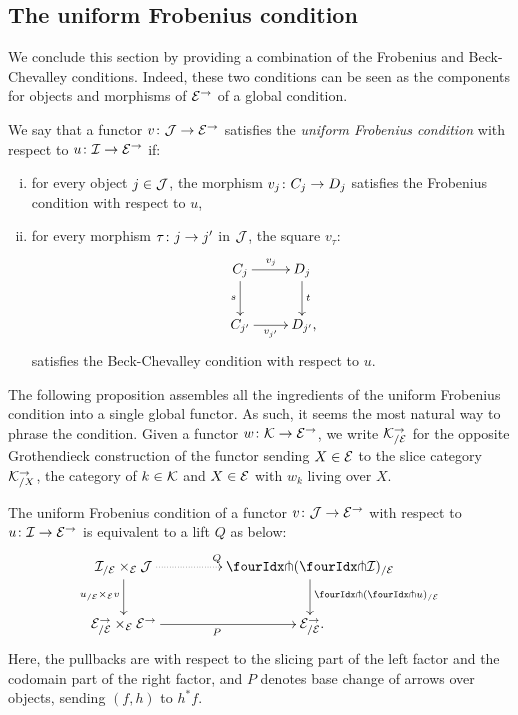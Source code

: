\documentclass[reqno,10pt,a4paper,oneside,draft]{amsart}
\begin{document}
\subsection*{The uniform Frobenius condition}

We conclude this section by providing a combination of the Frobenius and Beck-Chevalley conditions.
Indeed, these two conditions can be seen as the components for objects and morphisms of $\catE^\to$ of a global condition.

\begin{definition} \label{def:uniFrobcond}
We say that a functor $v \co \cal{J} \to \catE^\to$ satisfies the \emph{uniform Frobenius condition} with respect to $u \co \cal{I} \to \cal{E}^\to$ if:
\begin{enumerate}[(i)]
\item for every object $j \in \cal{J}$, the morphism $v_j \co C_j \to D_j$ satisfies the Frobenius condition with respect to $u$,
\item for every morphism $\tau \co j \to j'$ in $\cal{J}$, the square $v_\tau$:
\[
\xymatrix{
  C_j
  \ar[r]^{v_j}
  \ar[d]_{s}
&
  D_j
  \ar[d]^{t}
\\
  C_{j'}
  \ar[r]_-{v_{j'}}
&
  D_{j'}
\rlap{,}}
\]
satisfies the Beck-Chevalley condition with respect to $u$.
\end{enumerate}
\end{definition}

The following proposition assembles all the ingredients of the uniform Frobenius condition into a single global functor.
As such, it seems the most natural way to phrase the condition.
Given a functor $w \co \cal{K} \to \cal{E}^\to$, we write $\cal{K}_{/\cal{E}}^{\to}$ for the opposite Grothendieck construction of the functor sending $X \in \cal{E}$ to the slice category $\cal{K}_{/X}^{\to}$, \ie the category of $k \in \cal{K}$ and $X \in \cal{E}$ with $w_k$ living over $X$.

\begin{proposition}
\label{uniform-frob-nice}
The uniform Frobenius condition of a functor $v \co \cal{J} \to \cal{E}^\to$ with respect to $u \co \cal{I} \to \cal{E}^\to$ is equivalent to a lift $Q$ as below:
\begin{equation} \label{uniform-frob-nice:lift}
\begin{gathered}
\xymatrix@C+2em{
  \cal{I}_{/\cal{E}} \times_{\cal{E}} \cal{J}
  \ar@{.>}[r]^{Q}
  \ar[d]_{u_{/\cal{E}} \times_{\cal{E}} v}
&
  \liftl{(\liftr{\cal{I}})}_{/\cal{E}}
  \ar[d]^{\liftl{(\liftr{u})}_{/\cal{E}}}
\\
  \cal{E}^\to_{/\cal{E}} \times_{\cal{E}} \cal{E}^\to
  \ar[r]_{P}
&
  \cal{E}_{/\cal{E}}^\to
\rlap{.}}
\end{gathered}
\end{equation}
Here, the pullbacks are with respect to the slicing part of the left factor and the codomain part of the right factor, and $P$ denotes base change of arrows over objects, sending $(f, h)$ to $h^* f$.
\end{proposition}
\end{document}
